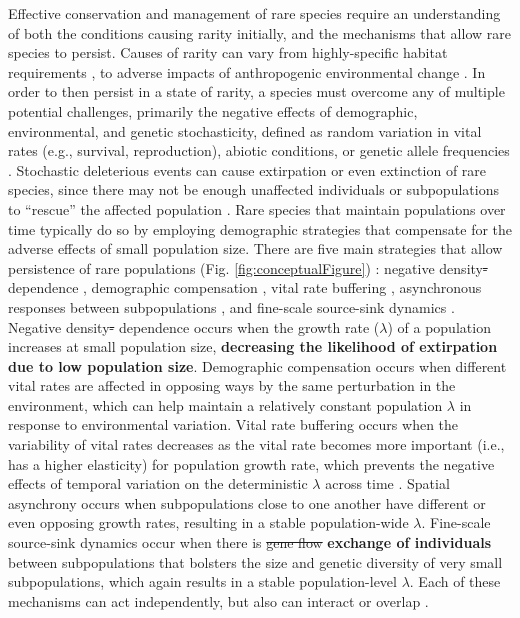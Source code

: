 \documentclass[12pt, letterpaper]{article}
\begin{document}
Effective conservation and management of rare species require an understanding of both the conditions causing rarity initially, and the mechanisms that allow rare species to persist. Causes of rarity can vary from highly-specific habitat requirements \cite{Sgarbi2018YouTime}, to adverse impacts of anthropogenic environmental change \cite{Vincent2020-tz}. In order to then persist in a state of rarity, a species must overcome any of multiple potential challenges, primarily the negative effects of demographic, environmental, and genetic stochasticity, defined as random variation in vital rates (e.g., survival, reproduction), abiotic conditions, or genetic allele frequencies \cite{May1973StabilityEnvironments}. Stochastic deleterious events can cause extirpation or even extinction of rare species, since there may not be enough unaffected individuals or subpopulations to “rescue” the affected population \cite{Nei1975ThePopulations}. Rare species that maintain populations over time typically do so by employing demographic strategies that compensate for the adverse effects of small population size. There are five main strategies that allow persistence of rare populations (Fig. \ref{fig:conceptualFigure}) \cite{Dibner2019}: negative density\sout{-} dependence \cite{Rovere2019PersistentlyAvoid}, demographic compensation \cite{Villellas2015DemographicImplications}, vital rate buffering \cite{Pfister1998PatternsImplications, Hilde2020TheChallenges}, asynchronous responses between subpopulations \cite{Abbott2017PortfolioWeberi}, and fine-scale source-sink dynamics \cite{Kauffman2004SpatialPopulation, Pulliam2016SourcesUse}. Negative density\sout{-} dependence occurs when the growth rate ($\lambda$) of a population increases at small population size, \textbf{decreasing the likelihood of extirpation due to low population size}. Demographic compensation occurs when different vital rates are affected in opposing ways by the same perturbation in the environment, which can help maintain a relatively constant population $\lambda$ in response to environmental variation. Vital rate buffering occurs when the variability of vital rates decreases as the vital rate becomes more important (i.e., has a higher elasticity) for population growth rate, which prevents the negative effects of temporal variation on the deterministic $\lambda$ across time \cite{Tuljapurkar1989An.}. Spatial asynchrony occurs when subpopulations close to one another have different or even opposing growth rates, resulting in a stable population-wide $\lambda$. Fine-scale source-sink dynamics occur when there is \sout{gene flow} \textbf{exchange of individuals} between subpopulations that bolsters the size and genetic diversity of very small subpopulations, which again results in a stable population-level $\lambda$. Each of these mechanisms can act independently, but also can interact or overlap \cite{Dibner2019}.  
\end{document}
